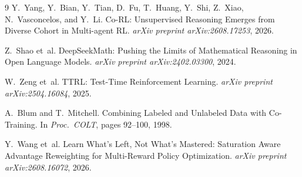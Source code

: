 \documentclass[11pt,a4paper]{article}
\begin{document}
\begin{thebibliography}{9}
Y.~Yang, Y.~Bian, Y.~Tian, D.~Fu, T.~Huang, Y.~Shi, Z.~Xiao, N.~Vasconcelos, and Y.~Li.
\newblock Co-RL: Unsupervised Reasoning Emerges from Diverse Cohort in Multi-agent RL.
\newblock \emph{arXiv preprint arXiv:2608.17253}, 2026.

Z.~Shao et~al.
\newblock DeepSeekMath: Pushing the Limits of Mathematical Reasoning in Open Language Models.
\newblock \emph{arXiv preprint arXiv:2402.03300}, 2024.

W.~Zeng et~al.
\newblock TTRL: Test-Time Reinforcement Learning.
\newblock \emph{arXiv preprint arXiv:2504.16084}, 2025.

A.~Blum and T.~Mitchell.
\newblock Combining Labeled and Unlabeled Data with Co-Training.
\newblock In \emph{Proc.\ COLT}, pages 92--100, 1998.

Y.~Wang et~al.
\newblock Learn What's Left, Not What's Mastered: Saturation Aware Advantage Reweighting for Multi-Reward Policy Optimization.
\newblock \emph{arXiv preprint arXiv:2608.16072}, 2026.
\end{thebibliography}
\end{document}

